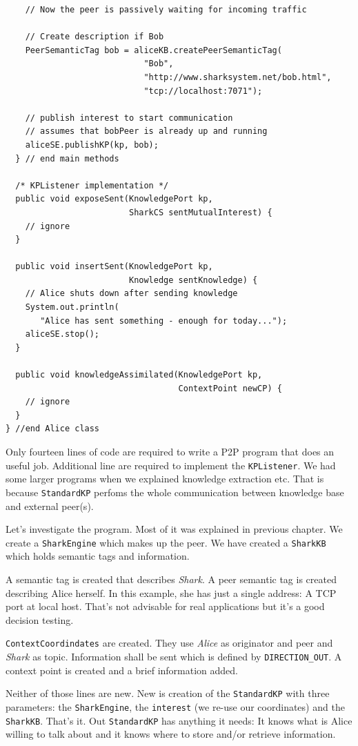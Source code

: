 \begin{verbatim}
    // Now the peer is passively waiting for incoming traffic

    // Create description if Bob
    PeerSemanticTag bob = aliceKB.createPeerSemanticTag(
                            "Bob",
                            "http://www.sharksystem.net/bob.html",
                            "tcp://localhost:7071");

    // publish interest to start communication
    // assumes that bobPeer is already up and running
    aliceSE.publishKP(kp, bob);
  } // end main methods

  /* KPListener implementation */
  public void exposeSent(KnowledgePort kp,
                         SharkCS sentMutualInterest) {
    // ignore
  }

  public void insertSent(KnowledgePort kp,
                         Knowledge sentKnowledge) {
    // Alice shuts down after sending knowledge
    System.out.println(
       "Alice has sent something - enough for today...");
    aliceSE.stop();
  }

  public void knowledgeAssimilated(KnowledgePort kp,
                                   ContextPoint newCP) {
    // ignore
  }
} //end Alice class
\end{verbatim}

Only fourteen lines of code are required to write a P2P program that does an useful job. Additional line are required to implement the {\tt KPListener}. We had some larger programs when we explained knowledge extraction etc. That is because {\tt StandardKP} perfoms the whole communication between knowledge base and external peer(s).

Let's investigate the program. Most of it was explained in previous chapter. We create a {\tt SharkEngine} which makes up the peer. We have created a {\tt SharkKB} which holds semantic tags and information.

A semantic tag is created that describes {\it Shark}. A peer semantic tag is created describing Alice herself. In this example, she has just a single address: A TCP port at local host. That's not advisable for real applications but it's a good decision testing.

{\tt ContextCoordindates} are created. They use {\it Alice} as originator and peer and {\it Shark} as topic. Information shall be sent which is defined by
{\tt DIRECTION\_OUT}. A context point is created and a brief information added.

Neither of those lines are new. New is creation of the {\tt StandardKP} with three parameters: the {\tt SharkEngine}, the {\tt interest} (we re-use our coordinates) and the {\tt SharkKB}. That's it. Out {\tt StandardKP} has anything it needs: It knows what is Alice willing to talk about and it knows where to store and/or retrieve information.

